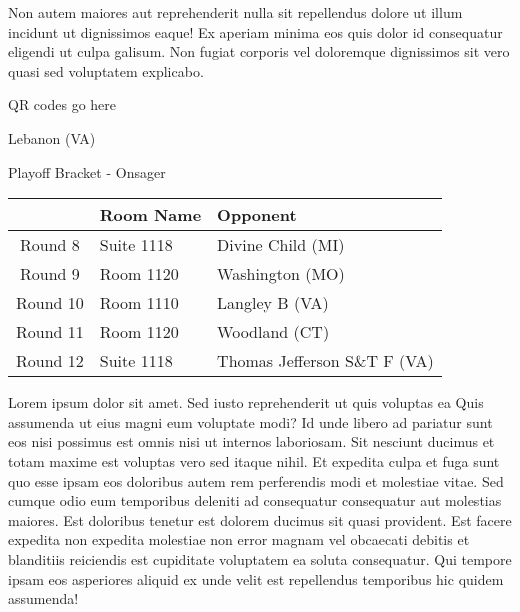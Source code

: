 \documentclass{article}%
\begin{document}
\newline%
Non autem maiores aut reprehenderit nulla sit repellendus dolore ut illum incidunt ut dignissimos eaque! Ex aperiam minima eos quis dolor id consequatur eligendi ut culpa galisum. Non fugiat corporis vel doloremque dignissimos sit vero quasi sed voluptatem explicabo.\newline%
\newline%
%
\vspace*{30pt}%
\begin{center}%
\begin{Huge}%
QR codes go here%
\end{Huge}%
\end{center}%
\newpage%
\begin{center}%
\begin{Huge}%
Lebanon (VA)%
\end{Huge}%
\vspace*{8pt}%
\linebreak%
\begin{Large}%
Playoff Bracket {-} Onsager%
\end{Large}%
\end{center}%
\begin{tabularx}{\textwidth}{|c|Y|Y|}%
\hline%
&Room Name&Opponent\\%
\hline%
Round 8&Suite 1118&Divine Child (MI)\\%
Round 9&Room 1120&Washington (MO)\\%
Round 10&Room 1110&Langley B (VA)\\%
Round 11&Room 1120&Woodland (CT)\\%
Round 12&Suite 1118&Thomas Jefferson S\&T F (VA)\\%
\hline%
\end{tabularx}%
\vspace*{8pt}%
\linebreak%
\newline%
\newline%
Lorem ipsum dolor sit amet. Sed iusto reprehenderit ut quis voluptas ea Quis assumenda ut eius magni eum voluptate modi? Id unde libero ad pariatur sunt eos nisi possimus est omnis nisi ut internos laboriosam. Sit nesciunt ducimus et totam maxime est voluptas vero sed itaque nihil. Et expedita culpa et fuga sunt quo esse ipsam eos doloribus autem rem perferendis modi et molestiae vitae.\newline%
\newline%
Sed cumque odio eum temporibus deleniti ad consequatur consequatur aut molestias maiores. Est doloribus tenetur est dolorem ducimus sit quasi provident. Est facere expedita non expedita molestiae non error magnam vel obcaecati debitis et blanditiis reiciendis est cupiditate voluptatem ea soluta consequatur. Qui tempore ipsam eos asperiores aliquid ex unde velit est repellendus temporibus hic quidem assumenda!\newline%
\end{document}
